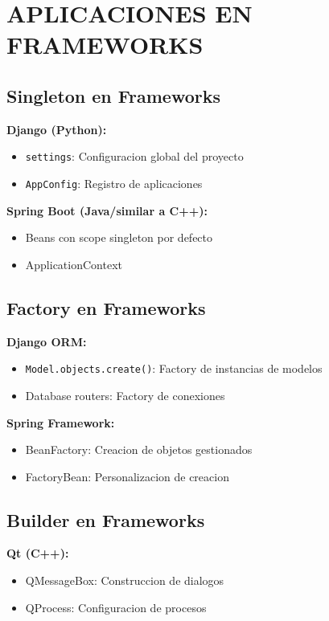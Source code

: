 \documentclass[11pt,a4paper]{article}
\begin{document}
\section{APLICACIONES EN FRAMEWORKS}

\subsection{Singleton en Frameworks}

\textbf{Django (Python):}
\begin{itemize}
    \item \texttt{settings}: Configuracion global del proyecto
    \item \texttt{AppConfig}: Registro de aplicaciones
\end{itemize}

\textbf{Spring Boot (Java/similar a C++):}
\begin{itemize}
    \item Beans con scope singleton por defecto
    \item ApplicationContext
\end{itemize}

\subsection{Factory en Frameworks}

\textbf{Django ORM:}
\begin{itemize}
    \item \texttt{Model.objects.create()}: Factory de instancias de modelos
    \item Database routers: Factory de conexiones
\end{itemize}

\textbf{Spring Framework:}
\begin{itemize}
    \item BeanFactory: Creacion de objetos gestionados
    \item FactoryBean: Personalizacion de creacion
\end{itemize}

\subsection{Builder en Frameworks}

\textbf{Qt (C++):}
\begin{itemize}
    \item QMessageBox: Construccion de dialogos
    \item QProcess: Configuracion de procesos
\end{itemize}
\end{document}
